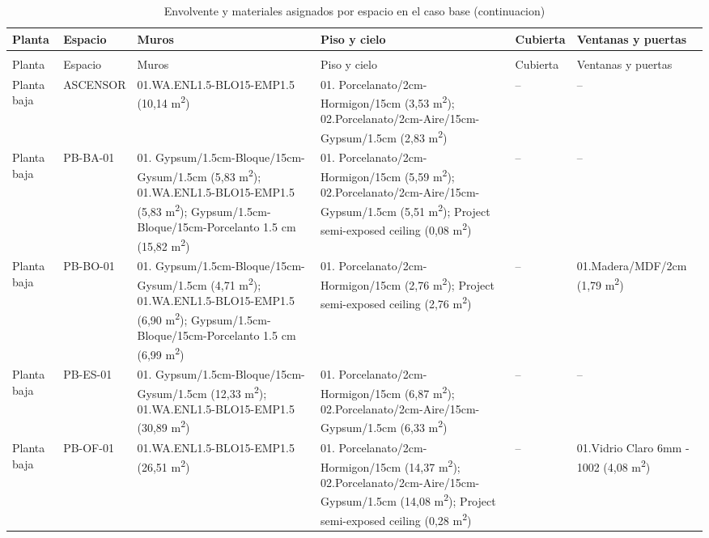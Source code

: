 {\fontsize{7}{9}\selectfont
\begin{longtable}{p{2.1cm}p{1.6cm}p{3.3cm}p{3.1cm}p{2.5cm}p{2.7cm}}
  \caption{Envolvente y materiales asignados por espacio en el caso base} \\
  \toprule
  Planta & Espacio & Muros & Piso y cielo & Cubierta & Ventanas y puertas \\
  \midrule
  \endfirsthead
  \caption[]{Envolvente y materiales asignados por espacio en el caso base (continuacion)} \\
  \toprule
  Planta & Espacio & Muros & Piso y cielo & Cubierta & Ventanas y puertas \\
  \midrule
  \endhead
  \bottomrule
  \endfoot
  Planta baja & ASCENSOR & 01.WA.ENL1.5-BLO15-EMP1.5 (10,14 m\textsuperscript{2}) & 01. Porcelanato/2cm-Hormigon/15cm (3,53 m\textsuperscript{2}); 02.Porcelanato/2cm-Aire/15cm-Gypsum/1.5cm (2,83 m\textsuperscript{2}) & -- & -- \\
  Planta baja & PB-BA-01 & 01. Gypsum/1.5cm-Bloque/15cm-Gysum/1.5cm (5,83 m\textsuperscript{2}); 01.WA.ENL1.5-BLO15-EMP1.5 (5,83 m\textsuperscript{2}); Gypsum/1.5cm-Bloque/15cm-Porcelanto 1.5 cm (15,82 m\textsuperscript{2}) & 01. Porcelanato/2cm-Hormigon/15cm (5,59 m\textsuperscript{2}); 02.Porcelanato/2cm-Aire/15cm-Gypsum/1.5cm (5,51 m\textsuperscript{2}); Project semi-exposed ceiling (0,08 m\textsuperscript{2}) & -- & -- \\
  Planta baja & PB-BO-01 & 01. Gypsum/1.5cm-Bloque/15cm-Gysum/1.5cm (4,71 m\textsuperscript{2}); 01.WA.ENL1.5-BLO15-EMP1.5 (6,90 m\textsuperscript{2}); Gypsum/1.5cm-Bloque/15cm-Porcelanto 1.5 cm (6,99 m\textsuperscript{2}) & 01. Porcelanato/2cm-Hormigon/15cm (2,76 m\textsuperscript{2}); Project semi-exposed ceiling (2,76 m\textsuperscript{2}) & -- & 01.Madera/MDF/2cm (1,79 m\textsuperscript{2}) \\
  Planta baja & PB-ES-01 & 01. Gypsum/1.5cm-Bloque/15cm-Gysum/1.5cm (12,33 m\textsuperscript{2}); 01.WA.ENL1.5-BLO15-EMP1.5 (30,89 m\textsuperscript{2}) & 01. Porcelanato/2cm-Hormigon/15cm (6,87 m\textsuperscript{2}); 02.Porcelanato/2cm-Aire/15cm-Gypsum/1.5cm (6,33 m\textsuperscript{2}) & -- & -- \\
  Planta baja & PB-OF-01 & 01.WA.ENL1.5-BLO15-EMP1.5 (26,51 m\textsuperscript{2}) & 01. Porcelanato/2cm-Hormigon/15cm (14,37 m\textsuperscript{2}); 02.Porcelanato/2cm-Aire/15cm-Gypsum/1.5cm (14,08 m\textsuperscript{2}); Project semi-exposed ceiling (0,28 m\textsuperscript{2}) & -- & 01.Vidrio Claro 6mm - 1002 (4,08 m\textsuperscript{2}) \\

\end{longtable}}
